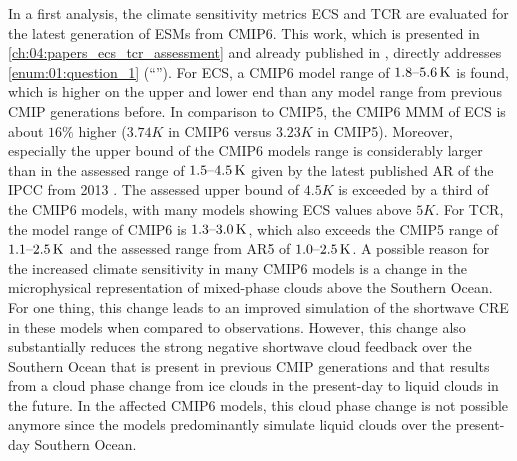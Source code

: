 In a first analysis, the climate sensitivity metrics \ac{ECS} and \ac{TCR} are
evaluated for the latest generation of \acp{ESM} from \acs{CMIP}6. This work,
which is presented in \cref{ch:04:papers_ecs_tcr_assessment} and already
published in \textcite{Bock2020, Meehl2020}, directly addresses
\cref{enum:01:question_1} (\enquote{\emph{\KeyScienceQuestionOne{}}}). For
\ac{ECS}, a \acs{CMIP}6 model range of $\rangeunit{1.8}{5.6}{K}$ is found,
which is higher on the upper and lower end than any model range from previous
\ac{CMIP} generations before. In comparison to \acs{CMIP}5, the \acs{CMIP}6
\ac{MMM} of \ac{ECS} is about $16 \unit{\%}$ higher ($3.74 \unit{K}$ in
\acs{CMIP}6 versus $3.23 \unit{K}$ in \acs{CMIP}5). Moreover, especially the
upper bound of the \acs{CMIP}6 models range is considerably larger than in the
assessed range of $\rangeunit{1.5}{4.5}{K}$ given by the latest published
\ac{AR} of the \ac{IPCC} from 2013 \autocite{Stocker2013}. The assessed upper
bound of $4.5 \unit{K}$ is exceeded by a third of the \acs{CMIP}6 models, with
many models showing \ac{ECS} values above $5 \unit{K}$. For \ac{TCR}, the model
range of \acs{CMIP}6 is $\rangeunit{1.3}{3.0}{K}$, which also exceeds the
\acs{CMIP}5 range of $\rangeunit{1.1}{2.5}{K}$ and the assessed range from
\acs{AR}5 of $\rangeunit{1.0}{2.5}{K}$. A possible reason for the increased
climate sensitivity in many \acs{CMIP}6 models is a change in the microphysical
representation of mixed-phase clouds above the Southern Ocean. For one thing,
this change leads to an improved simulation of the shortwave \ac{CRE} in these
models when compared to observations. However, this change also substantially
reduces the strong negative shortwave cloud feedback over the Southern Ocean
that is present in previous \ac{CMIP} generations and that results from a cloud
phase change from ice clouds in the present-day to liquid clouds in the future.
In the affected \acs{CMIP}6 models, this cloud phase change is not possible
anymore since the models predominantly simulate liquid clouds over the
present-day Southern Ocean.

